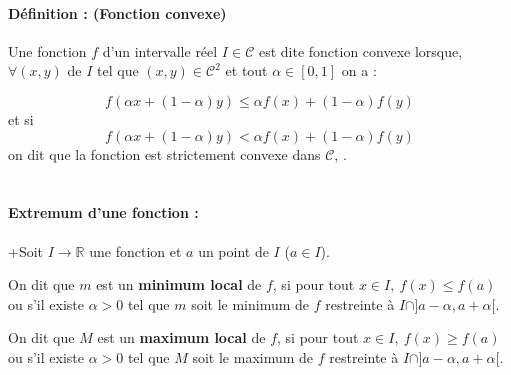 		\paragraph*{Définition : (Fonction convexe)}
		Une fonction $f$ d'un intervalle réel $I \in \mathcal{C}$ est dite fonction convexe lorsque, $\forall (x,y)$ de $I$ tel que $(x,y) \in \mathcal{C}^2$ et tout $\alpha \in [0, 1]$  on a :
		
		
		\begin{equation}
		f(\alpha x + (1 - \alpha)y) \leq \alpha f(x) + (1 - \alpha)f(y)
		\label{eq_convexe-1}
		\end{equation}
		et si
		\begin{equation}
		f(\alpha x + (1 - \alpha)y) < \alpha f(x) + (1 - \alpha)f(y)
		\label{eq_convexe-2}
		\end{equation}
		on dit que la fonction est strictement convexe dans $\mathcal{C}$,  \cite{jtshiman:2021}.\\\\
		
		\paragraph*{Extremum d'une fonction \cite{coulombeau2013math}: }
		\begin{list}{+}{Soit $I \rightarrow  \mathbb{R} $ une fonction et $a$ un point de $I$ ($a \in I$).}
			\item  {On dit que $m$ est un \textbf{minimum local} de $f$, si pour tout $x \in I,\ f(x) \leq f(a)$ ou
				s'il existe $\alpha > 0$ tel que $m$ soit le minimum de $f$ restreinte à $I \cap ] a-\alpha, a + \alpha [$. }
			\item On dit que $M$ est un \textbf{maximum local} de $f$, si pour tout $x \in I,\ f(x) \geq f(a)$ ou s'il existe $\alpha > 0$ tel que $M$ soit le maximum de $f$ restreinte à $I \cap ] a-\alpha, a + \alpha [$. 
		\end{list}
		
